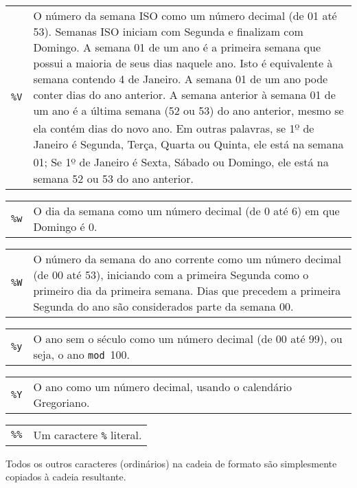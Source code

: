 \documentclass[11pt, brazil]{report}
\begin{document}
\begin{tabular}{@{}p{20pt}p{421.5pt}@{}}
{\tt\%V}&O número da semana ISO como um número decimal (de 01 até 53).
Semanas ISO iniciam com Segunda e finalizam com Domingo.
A semana 01 de um ano é a primeira semana que possui a maioria de
seus dias naquele ano. Isto é equivalente à semana contendo 4 de
Janeiro. A semana 01 de um ano pode conter dias do ano anterior.
A semana anterior à semana 01 de um ano é a última semana
(52 ou 53) do ano anterior, mesmo se ela contém dias do novo ano.
Em outras palavras, se 1{\textsuperscript{\b{o}}} de Janeiro
é Segunda, Terça, Quarta ou Quinta, ele está na semana 01;
Se 1{\textsuperscript{\b{o}}} de Janeiro é Sexta,
Sábado ou Domingo, ele está na semana 52 ou 53 do ano anterior.\\
\end{tabular}

\begin{tabular}{@{}p{20pt}p{421.5pt}@{}}
{\tt\%w}&O dia da semana como um número decimal (de 0 até 6) em que Domingo
é 0.\\
\end{tabular}

\begin{tabular}{@{}p{20pt}p{421.5pt}@{}}
{\tt\%W}&O número da semana do ano corrente como um número decimal (de
00 até 53), iniciando com a primeira Segunda como o primeiro dia da primeira
semana. Dias que precedem a primeira Segunda do ano são considerados parte
da semana 00.\\
\end{tabular}

\begin{tabular}{@{}p{20pt}p{421.5pt}@{}}
{\tt\%y}&O ano sem o século como um número decimal (de 00 até
99), ou seja, o ano \verb|mod|~100.\\
\end{tabular}

\begin{tabular}{@{}p{20pt}p{421.5pt}@{}}
{\tt\%Y}&O ano como um número decimal, usando o calendário Gregoriano.\\
\end{tabular}

\begin{tabular}{@{}p{20pt}p{421.5pt}@{}}
{\tt\%\%}&Um caractere \verb|%| literal.\\
\end{tabular}

Todos os outros caracteres (ordinários) na cadeia de formato são simplesmente copiados
à cadeia resultante.
\end{document}
